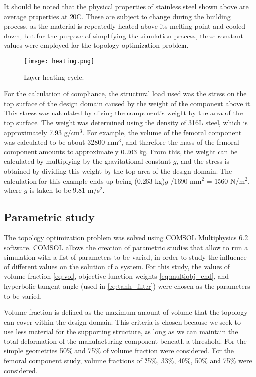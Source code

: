 \documentclass[../main.tex]{subfiles}
\begin{document}
It should be noted that the physical properties of stainless steel shown above are average properties at 20\degree C. These are subject to change during the building process, as the material is repeatedly heated above its melting point and cooled down, but for the purpose of simplifying the simulation process, these constant values were employed for the topology optimization problem. 

\begin{figure}
  \texttt{[image: heating.png]}
  \caption{Layer heating cycle.}
  \label{fig:heating}
\end{figure}

For the calculation of compliance, the structural load used was the stress on the top surface of the design domain caused by the weight of the component above it. This stress was calculated by diving the component's weight by the area of the top surface. The weight was determined using the density of 316L steel, which is approximately 7.93 g/cm$^3$. For example, the volume of the femoral component was calculated to be about 32800 mm$^3$, and therefore the mass of the femoral component amounts to approximately 0.263 kg. From this, the weight can be calculated by multiplying by the gravitational constant $g$, and the stress is obtained by dividing this weight by the top area of the design domain. The calculation for this example ends up being (0.263 kg)$g$ /1690 mm$^2$ = 1560 N/m$^2$, where $g$ is taken to be 9.81 m/s$^2$. 

\subsection{Parametric study}

The topology optimization problem was solved using COMSOL Multiphysics 6.2 software. COMSOL allows the creation of parametric studies that allow to run a simulation with a list of parameters to be varied, in order to study the influence of different values on the solution of a system. For this study, the values of volume fraction \ref{eq:vol}, objective function weights \ref{eq:multiobj_end}, and hyperbolic tangent angle (used in \ref{eq:tanh_filter}) were chosen as the parameters to be varied.

Volume fraction is defined as the maximum amount of volume that the topology can cover within the design domain. This criteria is chosen because we seek to use less material for the supporting structure, as long as we can maintain the total deformation of the manufacturing component beneath a threshold. For the simple geometries 50\% and 75\% of volume fraction were considered. For the femoral component study, volume fractions of 25\%, 33\%, 40\%, 50\% and 75\% were considered. 
\end{document}
